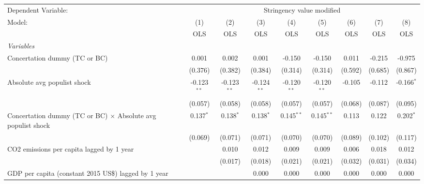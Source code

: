 
\begingroup
\centering
\begin{tabular}{lcccccccc}
   \toprule
   Dependent Variable: & \multicolumn{8}{c}{Stringency value modified}\\
   Model:                                                              & (1)           & (2)           & (3)           & (4)           & (5)           & (6)     & (7)          & (8)\\  
                                                                       &  OLS          & OLS           & OLS           & OLS           & OLS           & OLS     & OLS          & OLS\\  
   \midrule
   \emph{Variables}\\
   Concertation dummy (TC or BC)                                       & 0.001         & 0.002         & 0.001         & -0.150        & -0.150        & 0.011   & -0.215       & -0.975\\   
                                                                       & (0.376)       & (0.382)       & (0.384)       & (0.314)       & (0.314)       & (0.592) & (0.685)      & (0.867)\\   
   Absolute avg populist shock                                         & -0.123$^{**}$ & -0.123$^{**}$ & -0.124$^{**}$ & -0.120$^{**}$ & -0.120$^{**}$ & -0.105  & -0.112       & -0.166$^{*}$\\   
                                                                       & (0.057)       & (0.058)       & (0.058)       & (0.057)       & (0.057)       & (0.068) & (0.087)      & (0.095)\\   
   Concertation dummy (TC or BC) $\times$ Absolute avg populist shock  & 0.137$^{*}$   & 0.138$^{*}$   & 0.138$^{*}$   & 0.145$^{**}$  & 0.145$^{**}$  & 0.113   & 0.122        & 0.202$^{*}$\\   
                                                                       & (0.069)       & (0.071)       & (0.071)       & (0.070)       & (0.070)       & (0.089) & (0.102)      & (0.117)\\   
   CO2 emissions per capita lagged by 1 year                           &               & 0.010         & 0.012         & 0.009         & 0.009         & 0.006   & 0.018        & 0.012\\   
                                                                       &               & (0.017)       & (0.018)       & (0.021)       & (0.021)       & (0.032) & (0.031)      & (0.034)\\   
   GDP per capita (constant 2015 US\$) lagged by 1 year                &               &               & 0.000         & 0.000         & 0.000         & 0.000   & 0.000        & 0.000\\   

\end{tabular}
